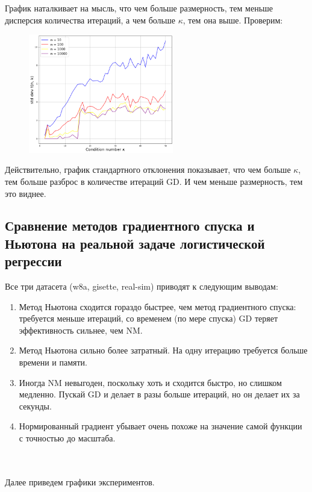 \documentclass[14pt]{article}
\begin{document}
График наталкивает на мысль, что чем больше размерность, тем меньше дисперсия количества итераций, а чем больше $\kappa$, тем она выше. Проверим:

\begin{figure}[h]
	\centering
\includegraphics[height=5.2cm]{stddev_kappa.png}
\end{figure}


Действительно, график стандартного отклонения показывает, что чем больше $\kappa$, тем больше разброс в количестве итераций GD. И чем меньше размерность, тем это виднее.



\newpage



\subsection{Сравнение методов градиентного спуска и Ньютона на реальной задаче логистической регрессии}

Все три датасета (w8a, gisette, real-sim) приводят к следующим выводам:
\begin{enumerate}
	\item Метод Ньютона сходится гораздо быстрее, чем метод градиентного спуска: требуется меньше итераций, со временем (по мере спуска) GD теряет эффективность сильнее, чем NM.
	\item Метод Ньютона сильно более затратный. На одну итерацию требуется больше времени и памяти.
	\item Иногда NM невыгоден, поскольку хоть и сходится быстро, но слишком медленно. Пускай GD и делает в разы больше итераций, но он делает их за секунды.
	\item Нормированный градиент убывает очень похоже на значение самой функции с точностью до масштаба.
\end{enumerate}
	\\ \\ Далее приведем графики экспериментов. 
\end{document}
